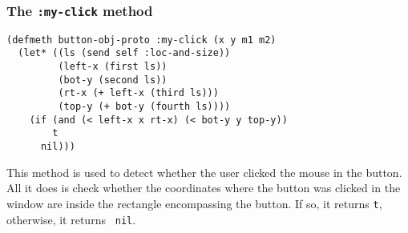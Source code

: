 \subsubsection{The {\tt :my-click} method}
\label{subsubsec:buttons-my-click}
\begin{verbatim}
(defmeth button-obj-proto :my-click (x y m1 m2)
  (let* ((ls (send self :loc-and-size))
         (left-x (first ls))
         (bot-y (second ls))
         (rt-x (+ left-x (third ls)))
         (top-y (+ bot-y (fourth ls))))
    (if (and (< left-x x rt-x) (< bot-y y top-y))
        t
      nil)))
\end{verbatim}
This method is used to detect whether the user clicked the mouse in
the button. All it does is check whether the coordinates where the
button was clicked in the window are inside the rectangle encompassing
the button.  If so, it returns {\tt t}, otherwise, it returns {\tt
  nil}.

